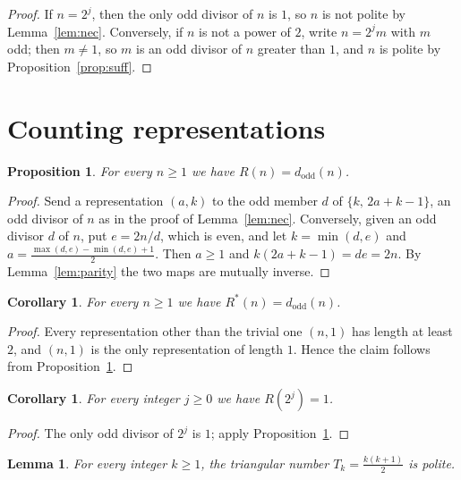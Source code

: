 \documentclass[11pt]{amsart}
\newtheorem{lemma}[theorem]{Lemma}
\newtheorem{proposition}[theorem]{Proposition}
\newtheorem{corollary}[theorem]{Corollary}
\theoremstyle{definition}
\theoremstyle{remark}
\begin{document}
\begin{proof}
If $n=2^{j}$, then the only odd divisor of $n$ is $1$, so $n$ is not polite by
Lemma~\ref{lem:nec}. Conversely, if $n$ is not a power of $2$, write
$n=2^{j}m$ with $m$ odd; then $m\ne 1$, so $m$ is an odd divisor of $n$
greater than $1$, and $n$ is polite by Proposition~\ref{prop:suff}.
\end{proof}

\section{Counting representations}\label{sec:count}

\begin{proposition}\label{prop:count}
For every $n\ge 1$ we have $R(n)=d_{\mathrm{odd}}(n)$.
\end{proposition}

\begin{proof}
Send a representation $(a,k)$ to the odd member $d$ of $\{k,\,2a+k-1\}$, an
odd divisor of $n$ as in the proof of Lemma~\ref{lem:nec}. Conversely, given an
odd divisor $d$ of $n$, put $e=2n/d$, which is even, and let $k=\min(d,e)$ and
$a=\frac{\max(d,e)-\min(d,e)+1}{2}$. Then $a\ge 1$ and $k(2a+k-1)=de=2n$.
By Lemma~\ref{lem:parity} the two maps are mutually inverse.
\end{proof}

\begin{corollary}\label{cor:nontriv}
For every $n\ge 1$ we have $R^{*}(n)=d_{\mathrm{odd}}(n)$.
\end{corollary}

\begin{proof}
Every representation other than the trivial one $(n,1)$ has length at least
$2$, and $(n,1)$ is the only representation of length $1$. Hence the claim
follows from Proposition~\ref{prop:count}.
\end{proof}

\begin{corollary}\label{cor:pow2}
For every integer $j\ge 0$ we have $R(2^{j})=1$.
\end{corollary}

\begin{proof}
The only odd divisor of $2^{j}$ is $1$; apply Proposition~\ref{prop:count}.
\end{proof}

\begin{lemma}\label{lem:tri}
For every integer $k\ge 1$, the triangular number $T_k=\frac{k(k+1)}{2}$ is
polite.
\end{lemma}
\end{document}
